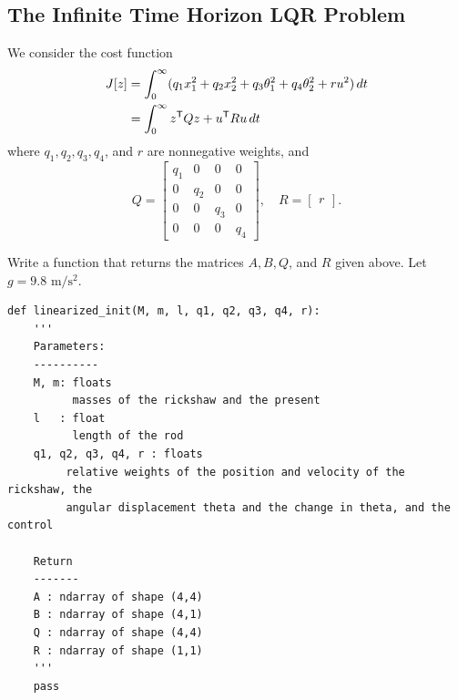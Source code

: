 \subsection*{The Infinite Time Horizon LQR Problem}
We consider the cost function
\begin{align}
\begin{split}
J[z] &= \int_0^{\infty} (q_1x_1^2 + q_2x_2^2  + q_3\theta_1^2 + q_4\theta_2^2 + ru^2)\, dt\\
&= \int_0^{\infty} z^{\mathsf T} Qz + u^{\mathsf T} Ru \, dt
\end{split} \label{inverted_pendulum:LQR}
\end{align}
where $q_1, q_2, q_3, q_4$, and $r$ are nonnegative weights, and 
\[
Q = 
\begin{bmatrix}
q_1 & 0 & 0 & 0 \\
0 & q_2 & 0 & 0\\
0 & 0 & q_3 & 0 \\
0 & 0 & 0 & q_4
\end{bmatrix}, \quad R = \begin{bmatrix} r \end{bmatrix}.
\]

\begin{problem}
Write a function that returns the matrices $A, B, Q$, and $R$ given above. Let $g = 9.8\text{ m}/\text{s}^2$.	
	
\begin{lstlisting}
def linearized_init(M, m, l, q1, q2, q3, q4, r): 
	'''
	Parameters:
	----------
	M, m: floats
          masses of the rickshaw and the present
	l 	: float
          length of the rod
	q1, q2, q3, q4, r : floats
         relative weights of the position and velocity of the rickshaw, the 
		 angular displacement theta and the change in theta, and the control
	
	Return
	-------
	A : ndarray of shape (4,4) 
	B : ndarray of shape (4,1) 
	Q : ndarray of shape (4,4) 
	R : ndarray of shape (1,1) 
	'''
	pass	
\end{lstlisting}
\end{problem}

